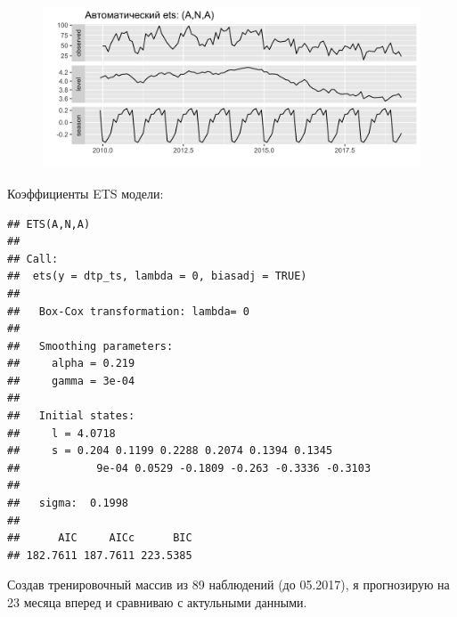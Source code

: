 \documentclass[14pt, a4paper]{extarticle}\usepackage[]{graphicx}\usepackage[]{color}
\makeatletter
\def\maxwidth{ %
  \ifdim\Gin@nat@width>\linewidth
    \linewidth
  \else
    \Gin@nat@width
  \fi
}
\newenvironment{kframe}{%
 \def\at@end@of@kframe{}%
 \ifinner\ifhmode%
  \def\at@end@of@kframe{\end{minipage}}%
  \begin{minipage}{\columnwidth}%
 \fi\fi%
 \def\FrameCommand##1{\hskip\@totalleftmargin \hskip-\fboxsep
 \colorbox{shadecolor}{##1}\hskip-\fboxsep
     \hskip-\linewidth \hskip-\@totalleftmargin \hskip\columnwidth}%
 \MakeFramed {\advance\hsize-\width
   \@totalleftmargin\z@ \linewidth\hsize
   \@setminipage}}%
 {\par\unskip\endMakeFramed%
 \at@end@of@kframe}
\newenvironment{knitrout}{}{} %
\makeatother
\begin{document}
\begin{figure}[H]
\begin{knitrout}
\color{fgcolor}

{\centering \includegraphics[width=\maxwidth]{figure/unnamed-chunk-12-1} 

}



\end{knitrout}
\end{figure}
Коэффициенты ETS модели:
\begin{knitrout}
\color{fgcolor}\begin{kframe}
\begin{verbatim}
## ETS(A,N,A) 
## 
## Call:
##  ets(y = dtp_ts, lambda = 0, biasadj = TRUE) 
## 
##   Box-Cox transformation: lambda= 0 
## 
##   Smoothing parameters:
##     alpha = 0.219 
##     gamma = 3e-04 
## 
##   Initial states:
##     l = 4.0718 
##     s = 0.204 0.1199 0.2288 0.2074 0.1394 0.1345
##            9e-04 0.0529 -0.1809 -0.263 -0.3336 -0.3103
## 
##   sigma:  0.1998
## 
##      AIC     AICc      BIC 
## 182.7611 187.7611 223.5385
\end{verbatim}
\end{kframe}
\end{knitrout}



Создав тренировочный массив из 89 наблюдений (до 05.2017), я прогнозирую на 23 месяца вперед и сравниваю с актульными данными. 
\end{document}
